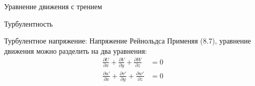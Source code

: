 \begin{chapter}{Уравнение движения с трением}
\begin{section}{Турбулентность}
\begin{paragraph}{Турбулентное напряжение: Напряжение Рейнольдса}
Применяя (8.7), уравнение движения можно разделить на два уравнения:
\begin{subequations}
\begin{align}
\frac{\partial{U }}{\partial{x}} 
 + \frac{\partial{V }}{\partial{y}} 
 + \frac{\partial{W }}{\partial{z}} &=0 \\
\frac{\partial{u'}}{\partial{x}} 
 + \frac{\partial{v'}}{\partial{y}} 
 + \frac{\partial{w'}}{\partial{z}} &=0
\end{align}
\end{subequations}
%


\end{paragraph}
\end{section}
\end{chapter}
